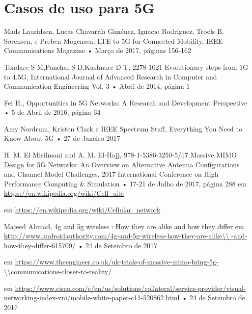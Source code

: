 \documentclass{llncs}
\begin{document}
\section{Casos de uso para 5G}

%
%
\begin{thebibliography}{11}

    Mads Lauridsen, Lucas Chavarría Giménez, Ignacio Rodriguez, Troels B. Sørensen, e Preben Mogensen,
    LTE to 5G for Connected Mobility, IEEE Communications Magazine
    • Março de 2017, páginas 156-162

    Tondare S M,Panchal S D,Kushnure D T,
    2278-1021
    Evolutionary steps from 1G to 4.5G,
    International Journal of Advanced Research in Computer and Communication Engineering Vol. 3
    • Abril de 2014, página 1

    Fei H.,
    Opportunities in 5G Networks: A Research and Development Perspective
    • 5 de Abril de 2016, página 34

    Amy Nordrum, Kristen Clark e IEEE Spectrum Staff,
    Everything You Need to Know About 5G
    • 27 de Janeiro 2017

    H. M. El Misilmani and A. M. El-Hajj,
    978-1-5386-3250-5/17
    Massive MIMO Design for 5G Networks: An Overview on Alternative Antenna Configurations and Channel Model Challenges,
    2017 International Conference on High Performance Computing \& Simulation
    • 17-21 de Julho de 2017, página 288
    em \url{https://en.wikipedia.org/wiki/Cell_site}

    em \url{https://en.wikipedia.org/wiki/Cellular_network}

    Majeed Ahmad,
    4g and 5g wireless : How they are alike and how they differ
    em \url{http://www.androidauthority.com/4g-and-5g-wireless-how-they-are-alike\\
    -and-how-they-differ-615709/}
    • 24 de Setembro de 2017

    em \url{https://www.theengineer.co.uk/uk-trials-of-massive-mimo-bring-5g-\\communications-closer-to-reality/}

    em \url{https://www.cisco.com/c/en/us/solutions/collateral/service-provider/visual-networking-index-vni/mobile-white-paper-c11-520862.html}
    • 24 de Setembro de 2017
\end{thebibliography}
\end{document}
